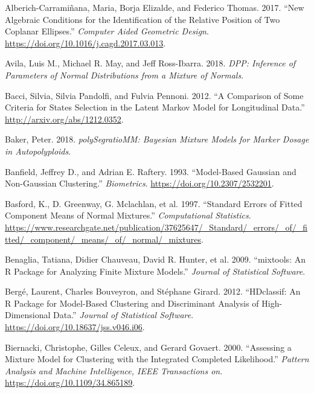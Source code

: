 \hypertarget{refs}{}
\begin{CSLReferences}{1}{0}
\leavevmode{}%
Alberich-Carramiñana, Maria, Borja Elizalde, and Federico Thomas. 2017. {``New Algebraic Conditions for the Identification of the Relative Position of Two Coplanar Ellipses.''} \emph{Computer Aided Geometric Design}. \url{https://doi.org/10.1016/j.cagd.2017.03.013}.

\leavevmode{}%
Avila, Luis M., Michael R. May, and Jeff Ross-Ibarra. 2018. \emph{DPP: Inference of Parameters of Normal Distributions from a Mixture of Normals}.

\leavevmode{}%
Bacci, Silvia, Silvia Pandolfi, and Fulvia Pennoni. 2012. {``A Comparison of Some Criteria for States Selection in the Latent {Markov} Model for Longitudinal Data.''} \url{http://arxiv.org/abs/1212.0352}.

\leavevmode{}%
Baker, Peter. 2018. \emph{polySegratioMM: Bayesian Mixture Models for Marker Dosage in Autopolyploids}.

\leavevmode{}%
Banfield, Jeffrey D., and Adrian E. Raftery. 1993. {``Model-{Based Gaussian} and {Non-Gaussian Clustering}.''} \emph{Biometrics}. \url{https://doi.org/10.2307/2532201}.

\leavevmode{}%
Basford, K., D. Greenway, G. Mclachlan, et al. 1997. {``Standard Errors of Fitted Component Means of Normal Mixtures.''} \emph{Computational Statistics}. \url{https://www.researchgate.net/publication/37625647/_Standard/_errors/_of/_fitted/_component/_means/_of/_normal/_mixtures}.

\leavevmode{}%
Benaglia, Tatiana, Didier Chauveau, David R. Hunter, et al. 2009. {``{mixtools}: An {R} Package for Analyzing Finite Mixture Models.''} \emph{Journal of Statistical Software}.

\leavevmode{}%
Bergé, Laurent, Charles Bouveyron, and Stéphane Girard. 2012. {``{HDclassif}: {An} {R} {Package} for {Model}-{Based} {Clustering} and {Discriminant} {Analysis} of {High}-{Dimensional} {Data}.''} \emph{Journal of Statistical Software}. \url{https://doi.org/10.18637/jss.v046.i06}.

\leavevmode{}%
Biernacki, Christophe, Gilles Celeux, and Gerard Govaert. 2000. {``Assessing a {Mixture Model} for {Clustering} with the {Integrated Completed Likelihood}.''} \emph{Pattern Analysis and Machine Intelligence, IEEE Transactions on}. \url{https://doi.org/10.1109/34.865189}.


\end{CSLReferences}
